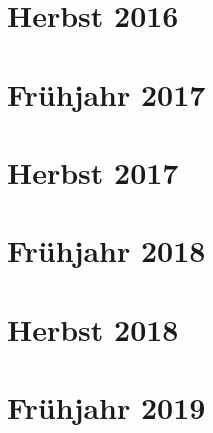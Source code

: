 \documentclass{lehramt-informatik-examen-sammlung}
\begin{document}
\section{Herbst 2016}


\section{Frühjahr 2017}


\section{Herbst 2017}


\section{Frühjahr 2018}


\section{Herbst 2018}


\section{Frühjahr 2019}

\end{document}
